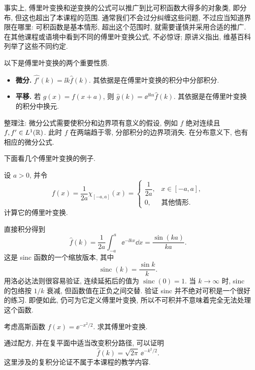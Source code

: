 事实上, 傅里叶变换和逆变换的公式可以推广到比可积函数大得多的对象类, 即分布, 但这也超出了本课程的范围. 通常我们不会过分纠缠这些问题, 不过应当知道界限在哪里: 可积函数是基本情形, 超出这个范围时, 就需要谨慎并采用合适的推广. 在其他课程或语境中看到不同的傅里叶变换公式, 不必惊讶; 原讲义指出, 维基百科列举了这些不同约定.

以下是傅里叶变换的两个重要性质.
\begin{itemize}
\item \textbf{微分.} $\widehat{f'}(k)=\ii k\widehat f(k)$. 其依据是在傅里叶变换的积分中分部积分.
\item \textbf{平移.} 若 $g(x)=f(x+a)$, 则 $\widehat g(k)=\ee^{\ii ka}\widehat f(k)$. 其依据是在傅里叶变换的积分中换元.
\end{itemize}
\begin{remark}
整理注: 微分公式需要使积分和边界项有意义的假设, 例如 $f$ 绝对连续且 $f,f'\in L^1(\mathbb R)$. 此时 $f$ 在两端趋于零, 分部积分的边界项消失. 在分布意义下, 也有相应的微分公式.
\end{remark}

下面看几个傅里叶变换的例子.

\begin{example}\label{ex:rectangle-ft}
设 $a>0$, 并令
\[
f(x)=\frac1{2a}\chi_{[-a,a]}(x)=
\begin{cases}
\dfrac1{2a},&x\in[-a,a],\\
0,&\text{其他情形}.
\end{cases}
\]
计算它的傅里叶变换.
\end{example}
\begin{solution}
直接积分得到
\[
\widehat f(k)=\frac1{2a}\int_{-a}^{a}\ee^{-\ii kx}\dd x
=\frac{\sin(ka)}{ka}.
\]
这是 sinc 函数的一个缩放版本, 其中
\[
\operatorname{sinc}(k)=\frac{\sin k}{k}.
\]
用洛必达法则很容易验证, 连续延拓后的值为 $\operatorname{sinc}(0)=1$. 当 $k\to\infty$ 时, sinc 的包络按 $1/k$ 衰减, 但函数值在正负之间交替. 验证 sinc 并不绝对可积是一个很好的练习. 即便如此, 仍可为它定义傅里叶变换, 所以不可积并不意味着完全无法处理这个函数.
\end{solution}

\begin{example}\label{ex:gaussian-ft}
考虑高斯函数 $f(x)=\ee^{-x^2/2}$. 求其傅里叶变换.
\end{example}
\begin{solution}
通过配方, 并在复平面中适当改变积分路径, 可以证明
\[
\widehat f(k)=\sqrt{2\pi}\,\ee^{-k^2/2}.
\]
这里涉及的复积分论证不属于本课程的教学内容.
\end{solution}

